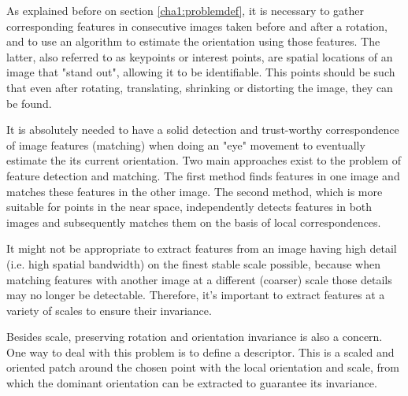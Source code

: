 As explained before on section \ref{cha1:problemdef}, it is necessary to gather corresponding features in consecutive images taken before and after a rotation, and to use an algorithm to estimate the orientation using those features. The latter, also referred to as keypoints or interest points, are spatial locations of an image that "stand out", allowing it to be identifiable. This points should be such that even after rotating, translating, shrinking or distorting the image, they can be found.

It is absolutely needed to have a solid detection and trust-worthy correspondence of image features (matching) when doing an "eye" movement to eventually estimate the its current orientation. Two main approaches exist to the problem of feature detection and matching. The first method finds features in one image and matches these features in the other image. The second method, which is more suitable for points in the near space, independently detects features in both images and subsequently matches them on the basis of local correspondences.

It might not be appropriate to extract features from an image having high detail (i.e. high spatial bandwidth) on the finest stable scale possible, because when matching features with another image at a different (coarser) scale those details may no longer be detectable. Therefore, it's important to extract features at a variety of scales to ensure their invariance. 

Besides scale, preserving rotation and orientation invariance is also a concern. One way to deal with this problem is to define a descriptor. This is a scaled and oriented patch around the chosen point with the local orientation and scale, from which the dominant orientation can be extracted to guarantee its invariance. \cite{multiview}

